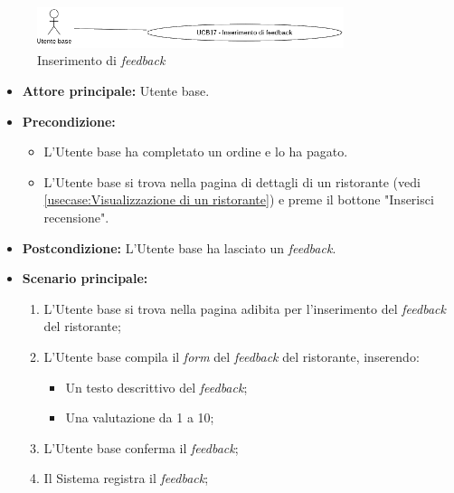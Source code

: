 \newpage
{}
\label{usecase:Inserimento di feedback}

\begin{figure}[h]
	\centering
	\includegraphics[width=0.8\textwidth]{./uml/UCB17.png} 
	\caption{Inserimento di \textit{feedback}}
	\label{fig:UCB16}
  \end{figure}

\begin{itemize}
	\item \textbf{Attore principale:} Utente base.

	\item \textbf{Precondizione:} 
	\begin{itemize}
		\item L'Utente base ha completato un ordine e lo ha pagato.
		\item L'Utente base si trova nella pagina di dettagli di un ristorante (vedi
		\autoref{usecase:Visualizzazione di un ristorante}) e preme il bottone "Inserisci recensione".
	\end{itemize}

	\item \textbf{Postcondizione:} L'Utente base ha lasciato un \textit{feedback}.

	\item \textbf{Scenario principale:}
	      \begin{enumerate}
		      \item L'Utente base si trova nella pagina adibita per l'inserimento del \textit{feedback} del ristorante;

		      \item L'Utente base compila il \textit{form} del \textit{feedback} del ristorante, inserendo: 
		            \begin{itemize}
			            \item Un testo descrittivo del \textit{feedback};
			            \item Una valutazione da 1 a 10;
		            \end{itemize}

		      \item L'Utente base conferma il \textit{feedback};

		      \item Il Sistema registra il \textit{feedback};

	      \end{enumerate}
\end{itemize}

